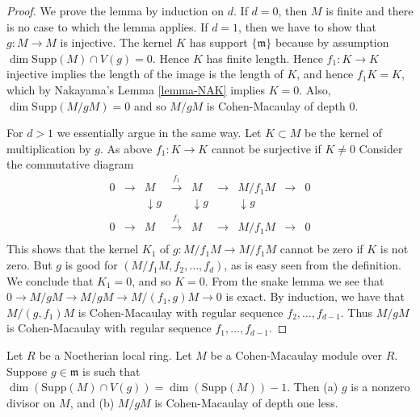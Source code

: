 \begin{proof}
We prove the lemma by induction on $d$.
If $d = 0$, then $M$ is finite and there is no case
to which the lemma applies.
If $d = 1$, then we have to show that $g : M \to M$ is
injective. The kernel $K$ has support $\{\mathfrak m\}$
because by assumption $\dim \text{Supp}(M) \cap V(g) = 0$.
Hence $K$ has finite length. Hence $f_1 : K \to K$ injective
implies the length of the image is the length of $K$, and hence
$f_1 K = K$, which by Nakayama's Lemma \ref{lemma-NAK} implies $K = 0$.
Also, $\dim \text{Supp}(M/gM) = 0$ and so $M/gM$ is Cohen-Macaulay
of depth $0$.

\medskip\noindent
For $d > 1$ we essentially argue in the same way. Let $K \subset M$
be the kernel of multiplication by $g$. As above $f_1 : K \to K$
cannot be surjective if $K \not= 0$
Consider the commutative diagram
$$
\begin{matrix}
0 & \to & M & \xrightarrow{f_1} & M & \to & M/f_1M & \to & 0 \\
& & \downarrow{g} & & \downarrow{g} & & \downarrow{g} && \\
0 & \to & M & \xrightarrow{f_1} & M & \to & M/f_1M & \to & 0 \\
\end{matrix}
$$
This shows that the kernel $K_1$ of $g : M/f_1M \to M/f_1M$
cannot be zero if $K$ is not zero. But $g$ is good for
$(M/f_1M, f_2, \ldots, f_d)$, as is easy seen from the definition.
We conclude that $K_1 = 0$, and so $K = 0$. From the snake
lemma we see that
$0 \to M/gM \to M/gM \to M/(f_1, g)M \to 0$
is exact. By induction, we have that $M/(g, f_1)M$
is Cohen-Macaulay with regular sequence $f_2, \ldots, f_{d-1}$.
Thus $M/gM$ is Cohen-Macaulay with regular sequence $f_1, \ldots, f_{d-1}$.
\end{proof}

\begin{lemma}
\label{lemma-CM-one-g}
Let $R$ be a Noetherian local ring.
Let $M$ be a Cohen-Macaulay module over $R$.
Suppose $g \in \mathfrak m$ is such that $\dim(\text{Supp}(M) \cap V(g))
= \dim(\text{Supp}(M)) - 1$. Then (a) $g$ is a nonzero divisor on $M$,
and (b) $M/gM$ is Cohen-Macaulay of depth one less.
\end{lemma}

